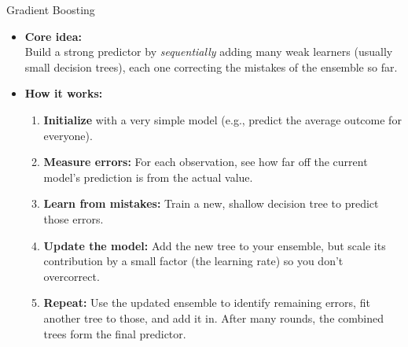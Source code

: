 \documentclass[
  ignorenonframetext,
]{beamer}
\providecommand{\tightlist}{%
  \setlength{\itemsep}{0pt}\setlength{\parskip}{0pt}}
\begin{document}
\begin{frame}{Gradient Boosting}
\label{gradient-boosting}
\begin{itemize}
\item
  \textbf{Core idea:}\\
  Build a strong predictor by \emph{sequentially} adding many weak
  learners (usually small decision trees), each one correcting the
  mistakes of the ensemble so far.
\item
  \textbf{How it works:}

  \begin{enumerate}
  \tightlist
  \item
    \textbf{Initialize} with a very simple model (e.g., predict the
    average outcome for everyone).\\
  \item
    \textbf{Measure errors:} For each observation, see how far off the
    current model's prediction is from the actual value.\\
  \item
    \textbf{Learn from mistakes:} Train a new, shallow decision tree to
    predict those errors.\\
  \item
    \textbf{Update the model:} Add the new tree to your ensemble, but
    scale its contribution by a small factor (the learning rate) so you
    don't overcorrect.\\
  \item
    \textbf{Repeat:} Use the updated ensemble to identify remaining
    errors, fit another tree to those, and add it in. After many rounds,
    the combined trees form the final predictor.
  \end{enumerate}
\end{itemize}
\end{frame}
\end{document}
